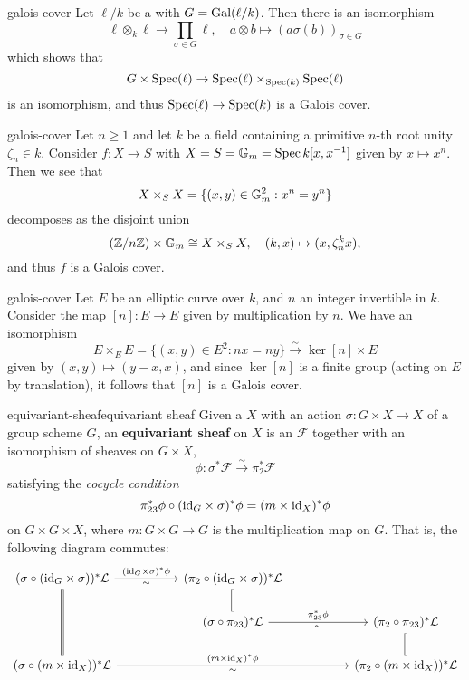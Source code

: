 \begin{example}{galois-cover}
    Let $\ell / k$ be a  with  $G = \textup{Gal}(\ell/k)$. Then there is an isomorphism
    \[ \ell \otimes_k \ell \to \prod_{\sigma \in G} \ell, \quad a \otimes b \mapsto (a \sigma(b))_{\sigma \in G} \]
    which shows that
    \[ G \times \operatorname{Spec}(\ell) \to \operatorname{Spec}(\ell) \times_{\operatorname{Spec}(k)} \operatorname{Spec}(\ell) \]
    is an isomorphism, and thus $\operatorname{Spec}(\ell) \to \operatorname{Spec}(k)$ is a Galois cover.
\end{example}

\begin{example}{galois-cover}
    Let $n \ge 1$ and let $k$ be a field containing a primitive $n$-th root unity $\zeta_n \in k$. Consider $f : X \to S$ with $X = S = \mathbb{G}_m = \operatorname{Spec} k[x, x^{-1}]$ given by $x \mapsto x^n$. Then we see that
    \[ X \times_S X = \{ (x, y) \in \mathbb{G}_m^2 : x^n = y^n \} \]
    decomposes as the disjoint union
    \[ (\mathbb{Z}/n\mathbb{Z}) \times \mathbb{G}_m \cong X \times_S X, \quad (k, x) \mapsto (x, \zeta_n^k x) , \]
    and thus $f$ is a Galois cover.
\end{example}

\begin{example}{galois-cover}
    Let $E$ be an elliptic curve over $k$, and $n$ an integer invertible in $k$. Consider the map $[n] : E \to E$ given by multiplication by $n$. We have an isomorphism
    \[ E \times_E E = \{ (x, y) \in E^2 : nx = ny \} \xrightarrow{\sim} \ker [n] \times E \]
    given by $(x, y) \mapsto (y - x, x)$, and since $\ker [n]$ is a finite group (acting on $E$ by translation), it follows that $[n]$ is a Galois cover.
\end{example}

\begin{topic}{equivariant-sheaf}{equivariant sheaf}
    Given a  $X$ with an action $\sigma : G \times X \to X$ of a group scheme $G$, an \textbf{equivariant sheaf} on $X$ is an  $\mathcal{F}$ together with an isomorphism of sheaves on $G \times X$,
    \[ \phi : \sigma^* \mathcal{F} \xrightarrow{\sim} \pi_2^* \mathcal{F} \]
    satisfying the \textit{cocycle condition}
    \[ \pi_{23}^* \phi \circ (\textup{id}_G \times \sigma)^* \phi = (m \times \textup{id}_X)^* \phi \]
    on $G \times G \times X$, where $m : G \times G \to G$ is the multiplication map on $G$. That is, the following diagram commutes:
    \[ \begin{tikzcd}[column sep=5em]
        (\sigma \circ (\id_G \times \sigma))^* \mathcal{L} \arrow["\sim{}"']{r}{(\id_G \times \sigma)^* \phi} \arrow[equal]{dd} & (\pi_2 \circ (\id_G \times \sigma))^* \mathcal{L} \arrow[equal]{d} & \\ & (\sigma \circ \pi_{23})^* \mathcal{L} \arrow["\sim{}"']{r}{\pi_{23}^* \phi} & (\pi_2 \circ \pi_{23})^* \mathcal{L} \arrow[equal]{d} \\ (\sigma \circ (m \times \id_X))^* \mathcal{L} \arrow["\sim{}"']{rr}{(m \times \id_X)^* \phi} & & (\pi_2 \circ (m \times \id_X))^* \mathcal{L}
    \end{tikzcd} \]
\end{topic}

